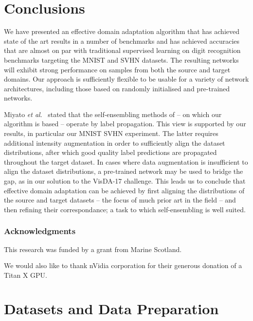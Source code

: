 \documentclass{article}
\newcommand{\etal}{\textit{et al}.}
\begin{document}
\section{Conclusions}
\label{sec:conc}

We have presented an effective domain adaptation algorithm that has achieved state of the art results in a number of benchmarks and has achieved accuracies that are almost on par with traditional supervised learning on digit recognition benchmarks targeting the MNIST and SVHN datasets. The resulting networks will exhibit strong performance on samples from both the source and target domains. Our approach is sufficiently flexible to be usable for a variety of network architectures, including those based on randomly initialised and pre-trained networks.

Miyato \etal~\cite{Miyato:VATSemiSup} stated that the self-ensembling methods of \cite{Laine:Temporal} -- on which our algorithm is based -- operate by label propagation. This view is supported by our results, in particular our MNIST  SVHN experiment. The latter requires additional intensity augmentation in order to sufficiently align the dataset distributions, after which good quality label predictions are propagated throughout the target dataset. In cases where data augmentation is insufficient to align the dataset distributions, a pre-trained network may be used to bridge the gap, as in our solution to the VisDA-17 challenge. This leads us to conclude that effective domain adaptation can be achieved by first aligning the distributions of the source and target datasets -- the focus of much prior art in the field -- and then refining their correspondance; a task to which self-ensembling is well suited.




\subsubsection*{Acknowledgments}

This research was funded by a grant from Marine Scotland.

We would also like to thank nVidia corporation for their generous donation of a Titan X GPU. 




\appendix

\section{Datasets and Data Preparation}
\label{app:datasets}
\end{document}
